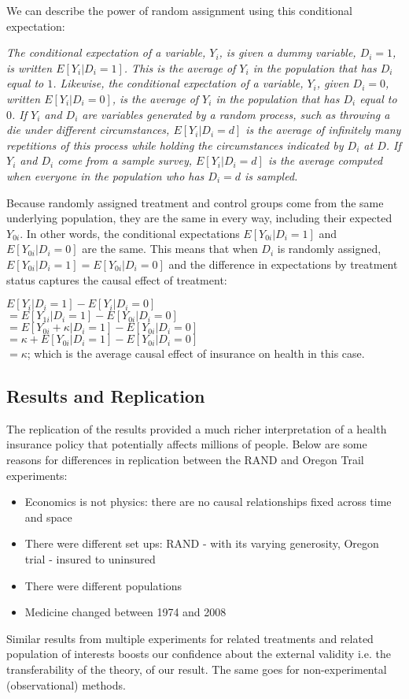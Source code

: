 \documentclass[12pt, letterpaper]{article}
\begin{document}
{\vspace{10pt}
\noindent We can describe the power of random assignment using this conditional expectation:
\begin{center}
	\textit{The conditional expectation of a variable, $Y_i$, is given a dummy variable, $D_i = 1$, is written $E[Y_i|D_i = 1]$. This is the average of $Y_i$ in the population that has $D_i$ equal to $1$. Likewise, the conditional expectation of a variable, $Y_i$, given $D_i = 0$, written $E[Y_i|D_i = 0]$, is the average of $Y_i$ in the population that has $D_i$ equal to $0$. If $Y_i$ and $D_i$ are variables generated by a random process, such as throwing a die under different circumstances, $E[Y_i|D_i = d]$ is the average of infinitely many repetitions of this process while holding the circumstances indicated by $D_i$ at $D$. If $Y_i$ and $D_i$ come from a sample survey, $E[Y_i|D_i = d]$ is the average computed when everyone in the population who has $D_i = d$ is sampled.}
\end{center}
Because randomly assigned treatment and control groups come from the same underlying population, they are the same in every way, including their expected $Y_{0i}$. In other words, the conditional expectations $E[Y_{0i}|D_{i} = 1]$ and $E[Y_{0i}|D_{i} = 0]$ are the same. This means that when $D_i$ is randomly assigned, $E[Y_{0i}|D_i = 1] = E[Y_{0i}|D_{i} = 0]$ and the difference in expectations by treatment status captures the causal effect of treatment:
\begin{center}	
	$E[Y_i|D_i = 1] - E[Y_i|D_i = 0]$\\
	$= E[Y_{1i}|D_i = 1] - E[Y_{0i}|D_i = 0]$\\
	$= E[Y_{0i}+ \kappa |D_i = 1] - E[Y_{0i}|D_i = 0]$\\
	$= \kappa + E[Y_{0i}|D_i = 1] - E[Y_{0i}|D_i = 0]$\\
	$= \kappa $; which is the average causal effect of insurance on health in this case.
\end{center}

\subsection{Results and Replication}
The replication of the results provided a much richer interpretation of a health insurance policy that potentially affects millions of people. Below are some reasons for differences in replication between the RAND and Oregon Trail experiments:
\begin{itemize}
	\item Economics is not physics: there are no causal relationships fixed across time and space
	\item There were different set ups: RAND - with its varying generosity, Oregon trial - insured to uninsured
	\item There were different populations
	\item Medicine changed between 1974 and 2008
\end{itemize}
Similar results from multiple experiments for related treatments and related population of interests boosts our confidence about the external validity i.e. the transferability of the theory, of our result. The same goes for non-experimental (observational) methods.

}
\end{document}
